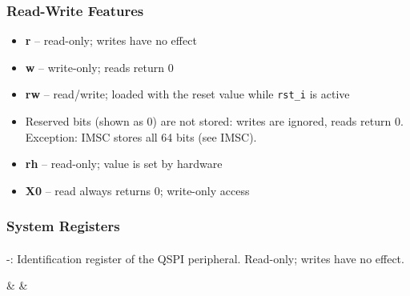\subsubsection{Read-Write Features}
\begin{itemize}
  \item \textbf{r}  -- read-only; writes have no effect
  \item \textbf{w}  -- write-only; reads return 0
  \item \textbf{rw} -- read/write; loaded with the reset value while \texttt{rst\_i} is active
  \item Reserved bits (shown as 0) are not stored: writes are ignored, reads return 0.
        Exception: IMSC stores all 64 bits (see IMSC).
  \item \textbf{rh} -- read-only; value is set by hardware
  \item \textbf{X0} -- read always returns 0; write-only access
\end{itemize}

\subsubsection{System Registers}
\paragraph{\asqspiIDRegExt} -:
Identification register of the QSPI peripheral. Read-only; writes have no effect.

                             {}
                             {}
                             {}
                             {}
                             {}
                             {&}
                             {&}
           
